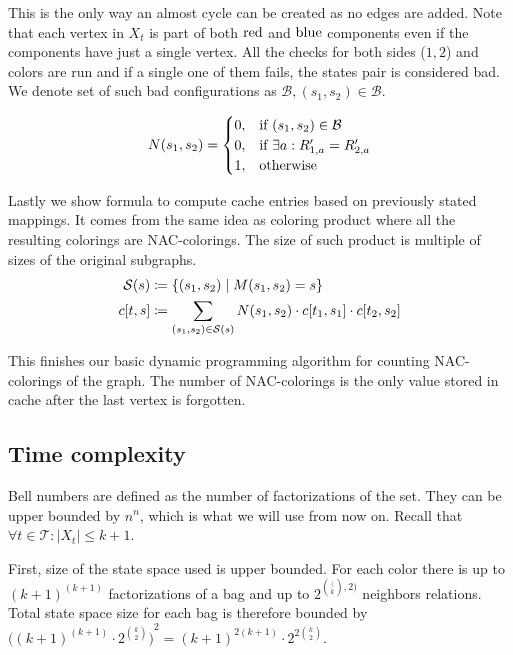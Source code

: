 This is the only way an almost cycle can be created as no edges are added.
Note that each vertex in \( X_t \) is part of both \( \text{red} \) and \( \text{blue} \)
components even if the components have just a single vertex.
All the checks for both sides (\( 1, 2 \)) and colors are run and
if a single one of them fails, the states pair is considered bad.
We denote set of such bad configurations as \( \mathcal{B}, (s_1, s_2) \in \mathcal{B} \).

%
\begin{align}
	N(s_1, s_2) =
	\begin{cases}
		0, & \text{if } (s_1, s_2) \in \mathcal{B}                  \\
		0, & \text{if } \exists a : R_{1,a}^\prime = R_{2,a}^\prime \\
		1, & \text{otherwise}
	\end{cases}\notag
\end{align}
%

Lastly we show formula to compute cache entries based on previously stated mappings.
It comes from the same idea as coloring product where all the resulting colorings
are NAC-colorings. The size of such product is multiple of sizes of the original subgraphs.
%
\begin{align}
	\mathcal{S}(s) & \coloneqq \{(s_1, s_2) \mid M(s_1, s_2) = s \}   \notag                                                     \\
	c[t, s]        & \coloneqq \sum_{(s_1, s_2) \in \mathcal{S}(s)} N(s_1, s_2) \cdot c[t_1, s_1] \cdot c[t_{2}, s_{2}]   \notag
\end{align}
%

This finishes our basic dynamic programming algorithm
for counting NAC-colorings of the graph.
The number of NAC-colorings is the only value stored in cache
after the last vertex is forgotten.



\subsection{Time complexity}

Bell numbers are defined as the number of factorizations of the set.
They can be upper bounded by \( n^n \), which is what we will use from now on.
Recall that \( \forall t \in \mathcal{T} : |X_t| \le k+1 \).

First, size of the state space used is upper bounded.
For each color there is up to \( {(k+1)}^{(k+1)} \) factorizations of a bag and
up to \( 2^{\binom(k, 2)} \) neighbors relations.
Total state space size for each bag is therefore bounded by
\( {\big({(k+1)}^{(k+1)} \cdot 2^{\binom{k}{2}} \big)}^2 = {(k+1)}^{2(k+1)} \cdot 2^{2 \binom{k}{2}} \).

